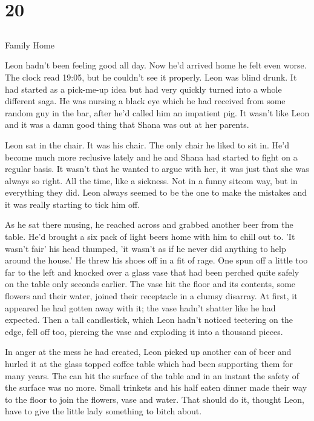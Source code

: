 \chapter{20}
\section{}
Family Home  

Leon hadn't been feeling good all day.  Now he'd arrived home he felt even worse.  The clock read 19:05, but he couldn't see it properly.  Leon was blind drunk.  It had started as a pick-me-up idea but had very quickly turned into a whole different saga.  He was nursing a black eye which he had received from some random guy in the bar, after he'd called him an impatient pig.  It wasn't like Leon and it was a damn good thing that Shana was out at her parents.  

Leon sat in the chair.  It was his chair.  The only chair he liked to sit in.  He'd become much more reclusive lately and he and Shana had started to fight on a regular basis.  It wasn't that he wanted to argue with her, it was just that she was always so right.  All the time, like a sickness.  Not in a funny sitcom way, but in everything they did.  Leon always seemed to be the one to make the mistakes and it was really starting to tick him off.

As he sat there musing, he reached across and grabbed another beer from the table.  He'd brought a six pack of light beers home with him to chill out to.  'It wasn't fair' his head thumped, 'it wasn't as if he never did anything to help around the house.'  He threw his shoes off in a fit of rage.  One spun off a little too far to the left and knocked over a glass vase that had been perched quite safely on the table only seconds earlier.  The vase hit the floor and its contents, some flowers and their water, joined their receptacle in a clumsy disarray.  At first, it appeared he had gotten away with it; the vase hadn't shatter like he had expected.  Then a tall candlestick, which Leon hadn't noticed teetering on the edge, fell off too, piercing the vase and exploding it into a thousand pieces.  

In anger at the mess he had created, Leon picked up another can of beer and hurled it at the glass topped coffee table which had been supporting them for many years.  The can hit the surface of the table and in an instant the safety of the surface was no more.  Small trinkets and his half eaten dinner made their way to the floor to join the flowers, vase and water.  That should do it, thought Leon, have to give the little lady something to bitch about.

